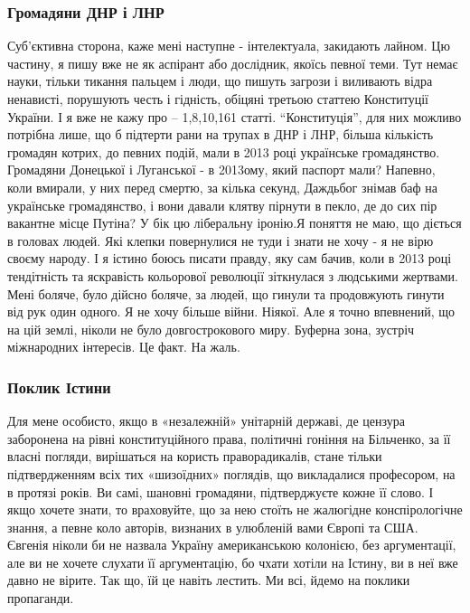 \subsubsection{Громадяни ДНР і ЛНР}

Суб'єктивна сторона, каже мені наступне - інтелектуала, закидають лайном. Цю
частину, я пишу вже не як аспірант або дослідник, якоїсь певної теми. Тут немає
науки, тільки тикання пальцем і люди, що пишуть загрози і виливають відра
ненависті, порушують честь і гідність, обіцяні  третьою статтею  Конституції
України. І я вже не кажу про – 1,8,10,161 статті. \enquote{Конституція}, для них
можливо потрібна лише, що б підтерти рани на трупах в ДНР і ЛНР, більша
кількість громадян котрих, до певних подій, мали в 2013 році українське
громадянство. Громадяни Донецької і Луганської - в 2013ому, який паспорт мали?
Напевно, коли вмирали, у них перед смертю, за кілька секунд, Даждьбог знімав
баф на українське громадянство, і вони давали клятву пірнути в пекло, де до сих
пір вакантне місце Путіна? У бік цю ліберальну іронію.Я поняття не маю, що
діється в головах людей. Які клепки повернулися не туди і знати не хочу - я не
вірю своєму народу. І я істино боюсь писати правду, яку сам бачив, коли в 2013
році тендітність та яскравість кольорової революції зіткнулася з людськими
жертвами. Мені боляче, було дійсно боляче, за людей, що гинули та продовжують
гинути від рук один одного. Я не хочу більше війни. Ніякої. Але я точно
впевнений, що на цій землі, ніколи не було довгострокового миру. Буферна зона,
зустріч міжнародних інтересів. Це факт. На жаль.  

\subsubsection{Поклик Істини}

Для мене особисто, якщо в «незалежній» унітарній державі, де цензура заборонена
на рівні конституційного права, політичні гоніння на Більченко, за її власні
погляди, вирішаться на користь праворадикалів, стане тільки підтвердженням всіх
тих «шизоїдних» поглядів, що викладалися професором, на в протязі років. Ви
самі, шановні громадяни, підтверджуєте кожне її слово. І якщо хочете знати, то
враховуйте, що за нею стоїть не жалюгідне конспірологічне знання, а певне коло
авторів, визнаних в улюбленій вами Європі та США. Євгенія ніколи би не назвала
Україну американською колонією, без аргументації, але ви не хочете слухати її
аргументацію, бо чхати хотіли на Істину, ви в неї вже давно не вірите.  Так що,
їй це навіть лестить. Ми всі, йдемо на поклики пропаганди. 

